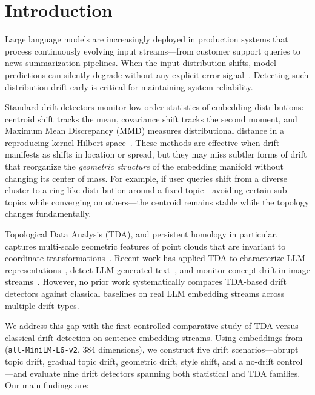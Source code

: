 \section{Introduction}
\label{sec:intro}

Large language models are increasingly deployed in production systems that process continuously evolving input streams---from customer support queries to news summarization pipelines. When the input distribution shifts, model predictions can silently degrade without any explicit error signal~\cite{khaki2023uncovering}. Detecting such distribution drift early is critical for maintaining system reliability.

Standard drift detectors monitor low-order statistics of embedding distributions: centroid shift tracks the mean, covariance shift tracks the second moment, and Maximum Mean Discrepancy (MMD) measures distributional distance in a reproducing kernel Hilbert space~\cite{khaki2023uncovering, sodar2023detecting}. These methods are effective when drift manifests as shifts in location or spread, but they may miss subtler forms of drift that reorganize the \emph{geometric structure} of the embedding manifold without changing its center of mass. For example, if user queries shift from a diverse cluster to a ring-like distribution around a fixed topic---avoiding certain sub-topics while converging on others---the centroid remains stable while the topology changes fundamentally.

Topological Data Analysis (TDA), and persistent homology in particular, captures multi-scale geometric features of point clouds that are invariant to coordinate transformations~\cite{tralie2019ripser, tauzin2020giotto}. Recent work has applied TDA to characterize LLM representations~\cite{gardinazzi2024persistent}, detect LLM-generated text~\cite{wei2025shortphd}, and monitor concept drift in image streams~\cite{basterrech2024unsupervised}. However, no prior work systematically compares TDA-based drift detectors against classical baselines on real LLM embedding streams across multiple drift types.

We address this gap with the first controlled comparative study of TDA versus classical drift detection on sentence embedding streams. Using \agnews embeddings from \minilm (\texttt{all-MiniLM-L6-v2}, 384 dimensions), we construct five drift scenarios---abrupt topic drift, gradual topic drift, geometric drift, style shift, and a no-drift control---and evaluate nine drift detectors spanning both statistical and TDA families. Our main findings are:

